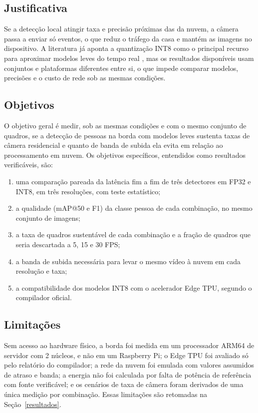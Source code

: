 \subsection{Justificativa}

Se a detecção local atingir taxa e precisão próximas das da nuvem, a câmera passa a enviar só eventos, o que reduz o tráfego da casa e mantém as imagens no dispositivo. A literatura já aponta a quantização INT8 como o principal recurso para aproximar modelos leves do tempo real , mas os resultados disponíveis usam conjuntos e plataformas diferentes entre si, o que impede comparar modelos, precisões e o custo de rede sob as mesmas condições.

\subsection{Objetivos}

O objetivo geral é medir, sob as mesmas condições e com o mesmo conjunto de quadros, se a detecção de pessoas na borda com modelos leves sustenta taxas de câmera residencial e quanto de banda de subida ela evita em relação ao processamento em nuvem. Os objetivos específicos, entendidos como resultados verificáveis, são:

\begin{enumerate}
    \item uma comparação pareada da latência fim a fim de três detectores em FP32 e INT8, em três resoluções, com teste estatístico;
    \item a qualidade (mAP@50 e F1) da classe pessoa de cada combinação, no mesmo conjunto de imagens;
    \item a taxa de quadros sustentável de cada combinação e a fração de quadros que seria descartada a 5, 15 e 30 FPS;
    \item a banda de subida necessária para levar o mesmo vídeo à nuvem em cada resolução e taxa;
    \item a compatibilidade dos modelos INT8 com o acelerador Edge TPU, segundo o compilador oficial.
\end{enumerate}

\subsection{Limitações}

Sem acesso ao hardware físico, a borda foi medida em um processador ARM64 de servidor com 2 núcleos, e não em um Raspberry Pi; o Edge TPU foi avaliado só pelo relatório do compilador; a rede da nuvem foi emulada com valores assumidos de atraso e banda; a energia não foi calculada por falta de potência de referência com fonte verificável; e os cenários de taxa de câmera foram derivados de uma única medição por combinação. Essas limitações são retomadas na Seção~\ref{resultados}.

